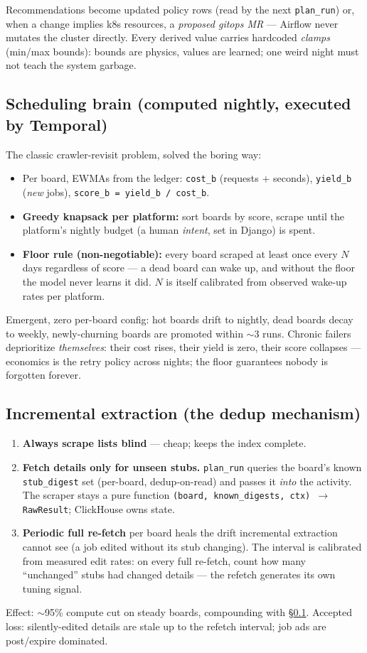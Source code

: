 \documentclass[11pt,a4paper]{article}
\newcommand{\gate}[1]{\textbf{\textcolor{red!60!black}{#1}}}
\begin{document}
Recommendations become updated policy rows (read by the next \texttt{plan\_run}) or, when a change implies
k8s resources, a \emph{proposed gitops MR} --- Airflow never mutates the cluster directly.
Every derived value carries hardcoded \emph{clamps} (min/max bounds): bounds are physics, values are
learned; one weird night must not teach the system garbage.

\subsection{Scheduling brain (computed nightly, executed by Temporal)}
\label{sec:scheduling}
The classic crawler-revisit problem, solved the boring way:
\begin{itemize}
\item Per board, EWMAs from the ledger: \texttt{cost\_b} (requests + seconds), \texttt{yield\_b}
(\emph{new} jobs), \texttt{score\_b = yield\_b / cost\_b}.
\item \textbf{Greedy knapsack per platform:} sort boards by score, scrape until the platform's nightly
budget (a human \emph{intent}, set in Django) is spent.
\item \gate{Floor rule (non-negotiable):} every board scraped at least once every $N$ days regardless of
score --- a dead board can wake up, and without the floor the model never learns it did. $N$ is itself
calibrated from observed wake-up rates per platform.
\end{itemize}
Emergent, zero per-board config: hot boards drift to nightly, dead boards decay to weekly, newly-churning
boards are promoted within $\sim$3 runs. Chronic failers deprioritize \emph{themselves}: their cost rises,
their yield is zero, their score collapses --- economics is the retry policy across nights; the floor
guarantees nobody is forgotten forever.

\subsection{Incremental extraction (the dedup mechanism)}
\label{sec:dedup}
\begin{enumerate}
\item \textbf{Always scrape lists blind} --- cheap; keeps the index complete.
\item \textbf{Fetch details only for unseen stubs.} \texttt{plan\_run} queries the board's known
\texttt{stub\_digest} set (per-board, dedup-on-read) and passes it \emph{into} the activity. The scraper
stays a pure function \texttt{(board, known\_digests, ctx) $\rightarrow$ RawResult}; ClickHouse owns state.
\item \textbf{Periodic full re-fetch} per board heals the drift incremental extraction cannot see (a job
edited without its stub changing). The interval is calibrated from measured edit rates: on every full
re-fetch, count how many ``unchanged'' stubs had changed details --- the refetch generates its own tuning
signal.
\end{enumerate}
Effect: $\sim$95\% compute cut on steady boards, compounding with \S\ref{sec:scheduling}. Accepted loss:
silently-edited details are stale up to the refetch interval; job ads are post/expire dominated.
\end{document}
